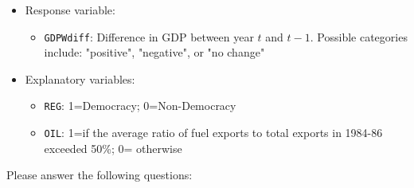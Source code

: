 \documentclass[12pt,letterpaper]{article}
\begin{document}
\begin{itemize}
	\item
	Response variable: 
	\begin{itemize}
		\item \texttt{GDPWdiff}: Difference in GDP between year $t$ and $t-1$. Possible categories include: "positive", "negative", or "no change"
	\end{itemize}
	\item
	Explanatory variables: 
	\begin{itemize}
		\item
		\texttt{REG}: 1=Democracy; 0=Non-Democracy
		\item
		\texttt{OIL}: 1=if the average ratio of fuel exports to total exports in 1984-86 exceeded 50\%; 0= otherwise
	\end{itemize}
	
\end{itemize}
\newpage
\noindent Please answer the following questions:
\end{document}
